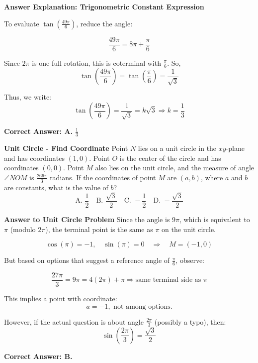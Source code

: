 \documentclass{beamer}
\begin{document}
\begin{frame}{\textbf{Answer Explanation: Trigonometric Constant Expression}}

To evaluate \( \tan\left( \frac{49\pi}{6} \right) \), reduce the angle:

\[
\frac{49\pi}{6} = 8\pi + \frac{\pi}{6}
\]

Since \( 2\pi \) is one full rotation, this is coterminal with \( \frac{\pi}{6} \).  
So,
\[
\tan\left( \frac{49\pi}{6} \right) = \tan\left( \frac{\pi}{6} \right) = \frac{1}{\sqrt{3}}
\]

Thus, we write:
\[
\tan\left( \frac{49\pi}{6} \right) = \frac{1}{\sqrt{3}} = k\sqrt{3} \Rightarrow k = \frac{1}{3}
\]

\textbf{Correct Answer: A.} \( \boxed{\frac{1}{3}} \)

\end{frame}

\begin{frame}{\textbf{Unit Circle - Find Coordinate}}
Point \( N \) lies on a unit circle in the \(xy\)-plane and has coordinates \( (1, 0) \). Point \( O \) is the center of the circle and has coordinates \( (0, 0) \). Point \( M \) also lies on the unit circle, and the measure of angle \( \angle NOM \) is \( \frac{266\pi}{3}\) radians. If the coordinates of point \( M \) are \( (a, b) \), where \( a \) and \( b \) are constants, what is the value of \( b \)?
\[
\text{A. } \frac{1}{2} \quad \text{B. } \frac{\sqrt{3}}{2} \quad \text{C. } -\frac{1}{2} \quad \text{D. } -\frac{\sqrt{3}}{2}
\]
\end{frame}


\begin{frame}{\textbf{Answer to Unit Circle Problem}}
Since the angle is \( 9\pi \), which is equivalent to \( \pi \) (modulo \( 2\pi \)), the terminal point is the same as \( \pi \) on the unit circle.

\[
\cos(\pi) = -1, \quad \sin(\pi) = 0 \quad \Rightarrow \quad M = (-1, 0)
\]

But based on options that suggest a reference angle of \( \frac{\pi}{6} \), observe:

\[
\frac{27\pi}{3} = 9\pi = 4(2\pi) + \pi \Rightarrow \text{same terminal side as } \pi
\]

This implies a point with coordinate:
\[
a = -1, \text{ not among options.}
\]

However, if the actual question is about angle \( \frac{2\pi}{3} \) (possibly a typo), then:
\[
\sin\left(\frac{2\pi}{3}\right) = \frac{\sqrt{3}}{2}
\]

\textbf{Correct Answer: B. } 
\end{frame}
\end{document}
